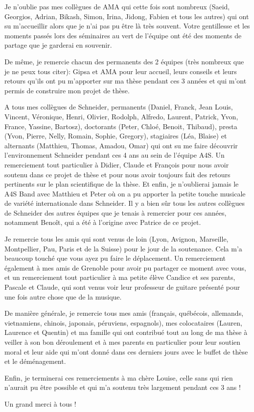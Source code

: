 Je n'oublie pas mes collègues de AMA qui cette fois sont nombreux (Saeid, Georgios, Adrian, Bikash, Simon, Irina, Jidong, Fabien et tous les autres) qui ont su m'accueillir alors que je n'ai pas pu être là très souvent. Votre gentillesse et les moments passés lors des séminaires au vert de l'équipe ont été des moments de partage que je garderai en souvenir.

De même, je remercie chacun des permanents des 2 équipes (très nombreux que je ne peux tous citer): Gipsa et AMA pour leur accueil, leurs conseils et leurs retours qu'ils ont pu m'apporter sur ma thèse pendant ces 3 années et qui m'ont permis de construire mon projet de thèse.

A tous mes collègues de Schneider, permanents (Daniel, Franck, Jean Louis, Vincent, Véronique, Henri, Olivier, Rodolph, Alfredo, Laurent, Patrick, Yvon, France, Yassine, Bartosz), doctorants (Peter, Chloé, Benoit, Thibaud), presta (Yvon, Pierre, Nelly, Romain, Sophie, Gregory), stagiaires (Léa, Blaise) et alternants (Matthieu, Thomas, Amadou, Omar) qui ont su me faire découvrir l'environnement Schneider pendant ces 4 ans au sein de l'équipe A4S. Un remerciement tout particulier à Didier, Claude et François pour nous avoir soutenu dans ce projet de thèse et pour nous avoir toujours fait des retours pertinents sur le plan scientifique de la thèse. Et enfin, je n'oublierai jamais le A4S Band avec Matthieu et Peter où on a pu apporter la petite touche musicale de variété internationale dans Schneider. Il y a bien sûr tous les autres collègues de Schneider des autres équipes que je tenais à remercier pour ces années, notamment Benoît, qui a été à l'origine avec Patrice de ce projet.

Je remercie tous les amis qui sont venus de loin (Lyon, Avignon, Marseille, Montpellier, Pau, Paris et de la Suisse) pour le jour de la soutenance. Cela m'a beaucoup touché que vous ayez pu faire le déplacement. Un remerciement également à mes amis de Grenoble pour avoir pu partager ce moment avec vous, et un remerciement tout particulier à ma petite élève Candice et ses parents, Pascale et Claude, qui sont venus voir leur professeur de guitare présenté pour une fois autre chose que de la musique.

De manière générale, je remercie tous mes amis (français, québécois, allemands, vietnamiens, chinois, japonais, péruviens, espagnols), mes colocataires (Lauren, Laurence et Quentin) et ma famille qui ont contribué tout au long de ma thèse à veiller à son bon déroulement et à mes parents en particulier pour leur soutien moral et leur aide qui m'ont donné dans ces derniers jours avec le buffet de thèse et le déménagement.

Enfin, je terminerai ces remerciements à ma chère Louise, celle sans qui rien n'aurait pu être possible et qui m'a soutenu très largement pendant ces 3 ans !

Un grand merci à tous !